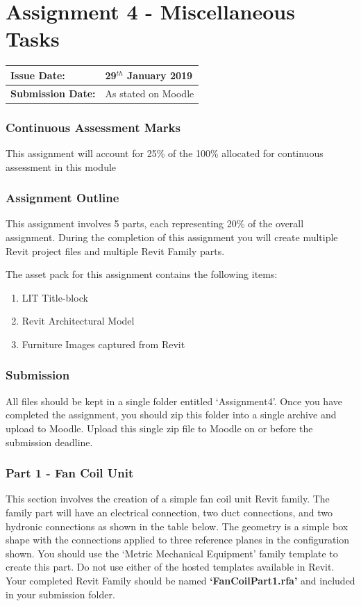 
	
\part*{Assignment 4 - Miscellaneous Tasks}

\begin{tabularx}{\textwidth}{ |X|X| }
	\hline
	\textbf{Issue Date:} & 29$^{th}$ January 2019 \\
	\hline 
	\textbf{Submission Date:}  & As stated on Moodle  \\
	\hline
\end{tabularx}

\section*{Continuous Assessment Marks}
This assignment will account for 25\% of the 100\% allocated for continuous assessment in this module

\section*{Assignment Outline}
This assignment involves 5 parts, each representing 20\% of the overall assignment. During the completion of this assignment you will create multiple Revit project files and multiple Revit Family parts.


The asset pack for this assignment contains the following items:
\begin{enumerate}
	\item LIT Title-block
	\item Revit Architectural Model
	\item Furniture Images captured from Revit
\end{enumerate}


\section*{Submission}
All files should be kept in a single folder entitled ‘Assignment4’. Once you have completed the assignment, you should zip this folder into a single archive and upload to Moodle. Upload this single zip file to Moodle on or before the submission deadline.


\newpage

\section*{Part 1 - Fan Coil Unit}
This section involves the creation of a simple fan coil unit Revit family. The family part will have an electrical connection, two duct connections, and two hydronic connections as shown in the table below. The geometry is a simple box shape with the connections applied to three reference planes in the configuration shown. You should use the ‘Metric Mechanical Equipment’ family template to create this part. Do not use either of the hosted templates available in Revit.  Your completed Revit Family should be named \textbf{‘FanCoilPart1.rfa’} and included in your submission folder.\\

